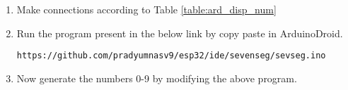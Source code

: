\begin{enumerate}[label=\arabic*.,ref=\theenumi]
\item
Make connections according to Table \ref{table:ard_disp_num}
\begin{table}[H]
\centering

\caption{}
\label{table:ard_disp_num}
\end{table}

\item
Run the program present in the below link by copy paste in ArduinoDroid.
%
\begin{lstlisting}
https://github.com/pradyumnasv9/esp32/ide/sevenseg/sevseg.ino
\end{lstlisting}
%
\item
Now generate the numbers 0-9 by modifying the above program.

\end{enumerate}
